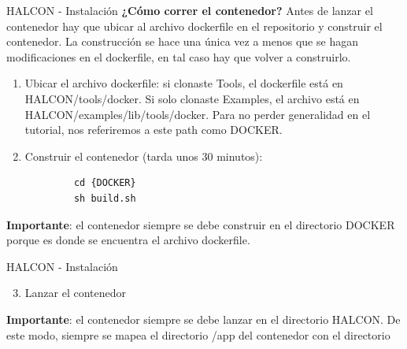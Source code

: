 \documentclass[11pt]{beamer}
\begin{document}
	\begin{frame}[fragile]{HALCON - Instalación}
		\textbf{¿Cómo correr el contenedor?}\newline
		Antes de lanzar el contenedor hay que ubicar al archivo dockerfile en el repositorio y construir el contenedor. La construcción se hace una única vez a menos que se hagan modificaciones en el dockerfile, en tal caso hay que volver a construirlo.
		\begin{enumerate}
			\item Ubicar el archivo dockerfile: si clonaste Tools, el dockerfile está en {HALCON}/tools/docker. Si solo clonaste Examples, el archivo está en {HALCON}/examples/lib/tools/docker. Para no perder generalidad en el tutorial, nos referiremos a este path como {DOCKER}.
			\item Construir el contenedor (tarda unos 30 minutos):
		\end{enumerate}
		
		\begin{lstlisting}
			cd {DOCKER}
			sh build.sh
		\end{lstlisting}
		
	\footnotesize \textbf{Importante}: el contenedor siempre se debe construir en el directorio {DOCKER} porque es donde se encuentra el archivo dockerfile.
	\end{frame}

	\begin{frame}{HALCON - Instalación}
	\begin{enumerate}
		\setcounter{enumi}{2}
		\item Lanzar el contenedor
	\end{enumerate}
	\vspace{0.9cm}
	\footnotesize \textbf{Importante}: el contenedor siempre se debe lanzar en el directorio {HALCON}. De este modo, siempre se mapea el directorio /app del contenedor con el directorio 
	\end{frame}
\end{document}
